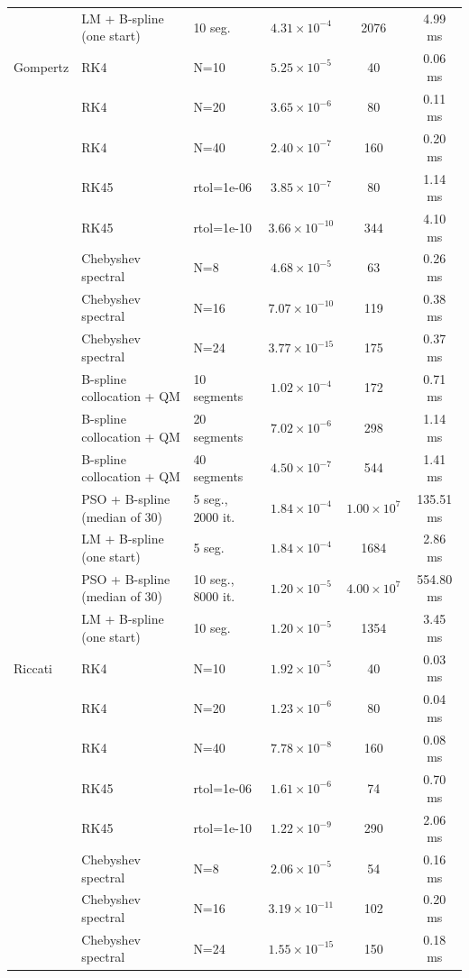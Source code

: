 \begin{tabular}{lllccc}
 & LM + B-spline (one start) & 10 seg. & $4.31\times10^{-4}$ & 2076 & 4.99 ms\\
\addlinespace
Gompertz & RK4 & N=10 & $5.25\times10^{-5}$ & 40 & 0.06 ms\\
 & RK4 & N=20 & $3.65\times10^{-6}$ & 80 & 0.11 ms\\
 & RK4 & N=40 & $2.40\times10^{-7}$ & 160 & 0.20 ms\\
 & RK45 & rtol=1e-06 & $3.85\times10^{-7}$ & 80 & 1.14 ms\\
 & RK45 & rtol=1e-10 & $3.66\times10^{-10}$ & 344 & 4.10 ms\\
 & Chebyshev spectral & N=8 & $4.68\times10^{-5}$ & 63 & 0.26 ms\\
 & Chebyshev spectral & N=16 & $7.07\times10^{-10}$ & 119 & 0.38 ms\\
 & Chebyshev spectral & N=24 & $3.77\times10^{-15}$ & 175 & 0.37 ms\\
 & B-spline collocation + QM & 10 segments & $1.02\times10^{-4}$ & 172 & 0.71 ms\\
 & B-spline collocation + QM & 20 segments & $7.02\times10^{-6}$ & 298 & 1.14 ms\\
 & B-spline collocation + QM & 40 segments & $4.50\times10^{-7}$ & 544 & 1.41 ms\\
 & PSO + B-spline (median of 30) & 5 seg., 2000 it. & $1.84\times10^{-4}$ & $1.00\times10^{7}$ & 135.51 ms\\
 & LM + B-spline (one start) & 5 seg. & $1.84\times10^{-4}$ & 1684 & 2.86 ms\\
 & PSO + B-spline (median of 30) & 10 seg., 8000 it. & $1.20\times10^{-5}$ & $4.00\times10^{7}$ & 554.80 ms\\
 & LM + B-spline (one start) & 10 seg. & $1.20\times10^{-5}$ & 1354 & 3.45 ms\\
\addlinespace
Riccati & RK4 & N=10 & $1.92\times10^{-5}$ & 40 & 0.03 ms\\
 & RK4 & N=20 & $1.23\times10^{-6}$ & 80 & 0.04 ms\\
 & RK4 & N=40 & $7.78\times10^{-8}$ & 160 & 0.08 ms\\
 & RK45 & rtol=1e-06 & $1.61\times10^{-6}$ & 74 & 0.70 ms\\
 & RK45 & rtol=1e-10 & $1.22\times10^{-9}$ & 290 & 2.06 ms\\
 & Chebyshev spectral & N=8 & $2.06\times10^{-5}$ & 54 & 0.16 ms\\
 & Chebyshev spectral & N=16 & $3.19\times10^{-11}$ & 102 & 0.20 ms\\
 & Chebyshev spectral & N=24 & $1.55\times10^{-15}$ & 150 & 0.18 ms\\

\end{tabular}
